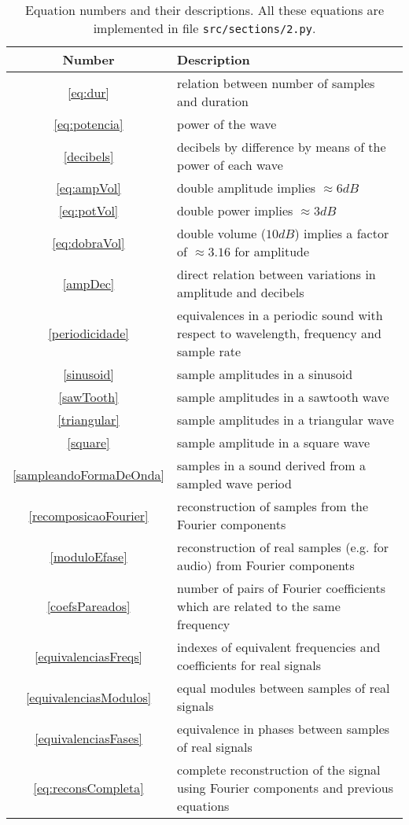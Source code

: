 \documentclass{scrreprt}
\begin{document}
\begin{table*}[htp!]
\centering
\caption{Equation numbers and their descriptions.
All these equations are implemented in file \texttt{src/sections/2.py}.}
\begin{tabular}{ c | p{12cm} }
   Number & Description \\\hline
 \ref{eq:dur} & relation between number of samples and duration \\
 \ref{eq:potencia} & power of the wave \\
 \ref{decibels} & decibels by difference by means of the power of each wave \\
 \ref{eq:ampVol} & double amplitude implies $\approx 6dB$ \\
 \ref{eq:potVol} & double power implies $\approx 3dB$ \\
 \ref{eq:dobraVol} & double volume ($10dB$) implies a factor of $\approx 3.16$ for amplitude \\
 \ref{ampDec} & direct relation between variations in amplitude and decibels \\
 \ref{periodicidade} & equivalences in a periodic sound with respect to wavelength, frequency and sample rate \\
 \ref{sinusoid} & sample amplitudes in a sinusoid \\
 \ref{sawTooth} & sample amplitudes in a sawtooth wave \\
 \ref{triangular} & sample amplitudes in a triangular wave \\
 \ref{square} & sample amplitude in a square wave \\
 \ref{sampleandoFormaDeOnda} & samples in a sound derived from a sampled wave period \\
 \ref{recomposicaoFourier} & reconstruction of samples from the Fourier components \\
 \ref{moduloEfase} & reconstruction of real samples (e.g. for audio) from Fourier components \\
 \ref{coefsPareados} & number of pairs of Fourier coefficients which are related to the same frequency \\
 \ref{equivalenciasFreqs} & indexes of equivalent frequencies and coefficients for real signals \\
 \ref{equivalenciasModulos} & equal modules between samples of real signals \\
 \ref{equivalenciasFases} & equivalence in phases between samples of real signals \\
 \ref{eq:reconsCompleta} & complete reconstruction of the signal using Fourier components and previous equations \\

\end{tabular}
\end{table*}
\end{document}

